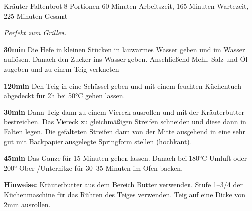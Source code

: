 \begin{recipe}{Kräuter-Faltenbrot} {8 Portionen} {60 Minuten Arbeitszeit, 165 Minuten Wartezeit, 225 Minuten Gesamt}

  \freeform
  \textit{Perfekt zum Grillen.}


  \textbf{30min}
  Die Hefe in kleinen Stücken in lauwarmes Wasser geben und im Wasser auflösen.
  Danach den Zucker ins Wasser geben.
  Anschließend Mehl, Salz und Öl zugeben und zu einem Teig verkneten

  \newstep
  \textbf{120min}
  Den Teig in eine Schüssel geben und mit einem feuchten Küchentuch abgedeckt für 2h bei 50°C gehen lassen.

  \newstep
  \textbf{30min}
  Dann Teig dann zu einem Viereck ausrollen und mit der Kräuterbutter bestreichen.
  Das Viereck zu gleichmäßigen Streifen schneiden und diese dann in Falten legen.
  Die gefalteten Streifen dann von der Mitte ausgehend in eine sehr gut mit Backpapier ausgelegte Springform stellen (hochkant).

  \newstep
  \textbf{45min}
  Das Ganze für 15 Minuten gehen lassen.
  Danach bei 180°C Umluft oder 200° Ober-/Unterhitze für 30--35 Minuten im Ofen backen.

  \freeform
  \hrulefill

  \freeform
  \textbf{Hinweise:}
  Kräuterbutter aus dem Bereich Butter verwenden.
  Stufe 1--3/4 der Küchenmaschine für das Rühren des Teiges verwenden.
  Teig auf eine Dicke von 2mm ausrollen.

  \end{recipe}

